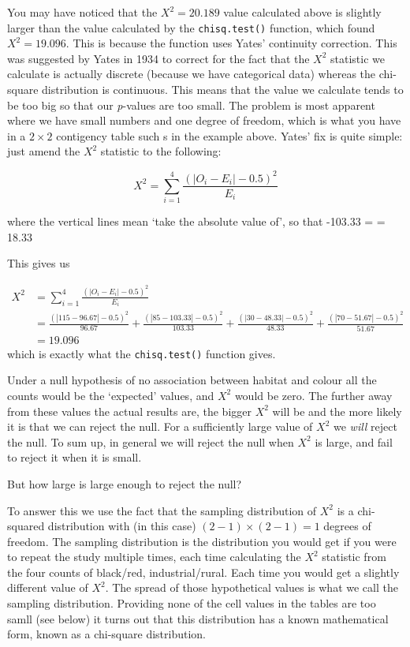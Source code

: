 \documentclass[
  letterpaper,
  DIV=11,
  numbers=noendperiod]{scrreprt}
\begin{document}
You may have noticed that the \(X^2 = 20.189\) value calculated above is
slightly larger than the value calculated by the \texttt{chisq.test()}
function, which found \(X^2 = 19.096\). This is because the function
uses Yates' continuity correction. This was suggested by Yates in 1934
to correct for the fact that the \(X^2\) statistic we calculate is
actually discrete (because we have categorical data) whereas the
chi-square distribution is continuous. This means that the value we
calculate tends to be too big so that our \emph{p}-values are too small.
The problem is most apparent where we have small numbers and one degree
of freedom, which is what you have in a \(2 \times 2\) contigency table
such s in the example above. Yates' fix is quite simple: just amend the
\(X^2\) statistic to the following:

\[
X^2=\sum_{i=1}^4\frac{(\lvert O_i-E_i \rvert - 0.5)^2}{E_i}
\]

where the vertical lines mean `take the absolute value of', so that
-103.33\textbar{} = \textbar{} = 18.33

This gives us

\[
\begin{align*}
X^2&=\sum_{i=1}^4\frac{(\lvert O_i-E_i \rvert - 0.5)^2}{E_i}\\
&=\frac{(|115-96.67|-0.5)^2}{96.67} + \frac{(|85-103.33|-0.5)^2}{103.33} + \frac{(|30-48.33|-0.5)^2}{48.33} + \frac{(|70-51.67|-0.5)^2}{51.67}\\
&=19.096
\end{align*}
\] which is exactly what the \texttt{chisq.test()} function gives.

Under a null hypothesis of no association between habitat and colour all
the counts would be the `expected' values, and \(X^2\) would be zero.
The further away from these values the actual results are, the bigger
\(X^2\) will be and the more likely it is that we can reject the null.
For a sufficiently large value of \(X^2\) we \emph{will} reject the
null. To sum up, in general we will reject the null when \(X^2\) is
large, and fail to reject it when it is small.

But how large is large enough to reject the null?

To answer this we use the fact that the sampling distribution of \(X^2\)
is a chi-squared distribution with (in this case)
\((2-1) \times (2-1) = 1\) degrees of freedom. The sampling distribution
is the distribution you would get if you were to repeat the study
multiple times, each time calculating the \(X^2\) statistic from the
four counts of black/red, industrial/rural. Each time you would get a
slightly different value of \(X^2\). The spread of those hypothetical
values is what we call the sampling distribution. Providing none of the
cell values in the tables are too samll (see below) it turns out that
this distribution has a known mathematical form, known as a chi-square
distribution.
\end{document}
